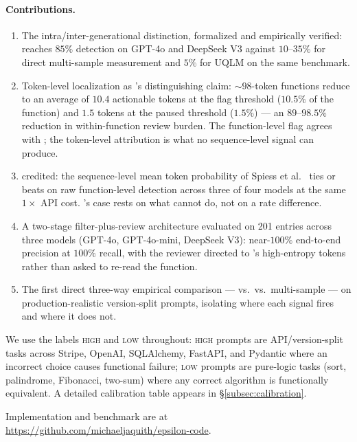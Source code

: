\paragraph{Contributions.}
\begin{enumerate}[noitemsep]
    \item The intra/inter-generational distinction, formalized and
    empirically verified: \eps reaches $85\%$ detection on GPT-4o and
    DeepSeek V3 against $10$--$35\%$ for direct multi-sample
    measurement and $5\%$ for UQLM on the same benchmark.
    \item Token-level localization as \eps's distinguishing claim:
    $\sim 98$-token functions reduce to an average of $10.4$
    actionable tokens at the flag threshold ($10.5\%$ of the function)
    and $1.5$ tokens at the paused threshold ($1.5\%$) --- an
    $89$--$98.5\%$ reduction in within-function review burden. The
    function-level flag agrees with \papg; the token-level attribution
    is what no sequence-level signal can produce.
    \item \papg credited: the sequence-level mean token probability
    of Spiess et al.~\cite{spiess2025calibration} ties or beats \eps
    on raw function-level detection across three of four models at
    the same $1\times$ API cost. \eps's case rests on what \papg
    cannot do, not on a rate difference.
    \item A two-stage filter-plus-review architecture evaluated on
    201 entries across three models (GPT-4o, GPT-4o-mini, DeepSeek
    V3): near-$100\%$ end-to-end precision at $100\%$ recall, with
    the reviewer directed to \eps's high-entropy tokens rather than
    asked to re-read the function.
    \item The first direct three-way empirical comparison --- \eps
    vs.\ \papg vs.\ multi-sample --- on production-realistic
    version-split prompts, isolating where each signal fires and
    where it does not.
\end{enumerate}

We use the labels \textsc{high} and \textsc{low} throughout:
\textsc{high} prompts are API/version-split tasks across Stripe,
OpenAI, SQLAlchemy, FastAPI, and Pydantic where an incorrect choice
causes functional failure; \textsc{low} prompts are pure-logic tasks
(sort, palindrome, Fibonacci, two-sum) where any correct algorithm
is functionally equivalent. A detailed calibration table appears in
\S\ref{subsec:calibration}.

Implementation and benchmark are at
\url{https://github.com/michaeljaquith/epsilon-code}.
